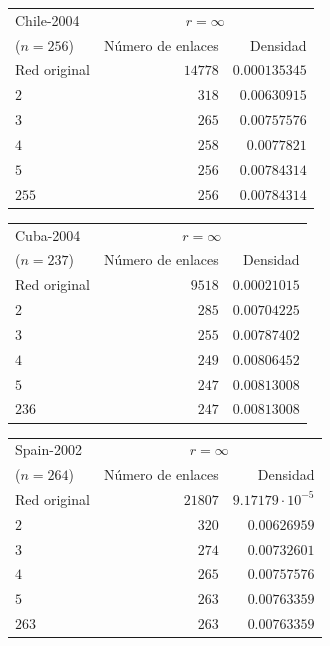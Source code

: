 \documentclass[10pt,a4paper,spanish]{article}
\numberwithin{equation}{section} %
\numberwithin{figure}{section} %
\numberwithin{table}{section} %
\begin{document}
\begin{tabular}{lrr}
\hline
 Chile-2004 & \multicolumn{2}{c}{$r = \infty$} \\
($n=256$)   &   Número de enlaces &    Densidad \\
\hline
 Red original             &               $14778$ & $0.000135345$ \\
 $2$                        &                 $318$ & $0.00630915$  \\
 $3$                        &                 $265$ & $0.00757576$  \\
 $4$                        &                 $258$ & $0.0077821$   \\
 $5$                        &                 $256$ & $0.00784314$  \\
 $255$                      &                 $256$ & $0.00784314$  \\
\hline
\end{tabular}


\begin{tabular}{lrr}
\hline
 Cuba-2004 & \multicolumn{2}{c}{$r = \infty$} \\
($n=237$)   &   Número de enlaces &   Densidad \\
\hline
 Red original            &                $9518$ & $0.00021015$ \\
 $2$                       &                 $285$ & $0.00704225$ \\
 $3$                       &                 $255$ & $0.00787402$ \\
 $4$                       &                 $249$ & $0.00806452$ \\
 $5$                       &                 $247$ & $0.00813008$ \\
 $236$                     &                 $247$ & $0.00813008$ \\
\hline
\end{tabular}

\begin{tabular}{lrr}
\hline
 Spain-2002 & \multicolumn{2}{c}{$r = \infty$} \\
($n=264$)   &   Número de enlaces &    Densidad \\
\hline
 Red original             &               $21807$ & $9.17179 \cdot 10^{-5}$ \\
 $2$                        &                 $320$ & $0.00626959$  \\
 $3$                        &                 $274$ & $0.00732601$  \\
 $4$                        &                 $265$ & $0.00757576$  \\
 $5$                        &                 $263$ & $0.00763359$  \\
 $263$                      &                 $263$ & $0.00763359$  \\
\hline
\end{tabular}
\end{document}
